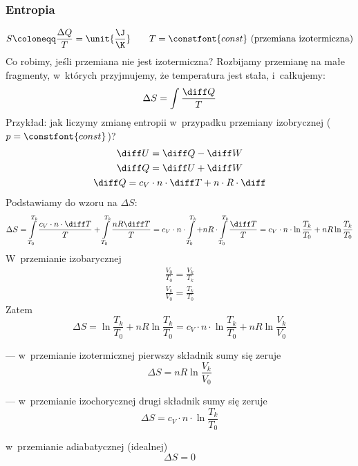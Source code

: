 \subsubsection*{Entropia}
\begin{equation*}
    S \coloneqq \frac{\Delta Q}{T} = \unit{\frac{\J}{\K}} \qquad T = \constfont{const} \text{ (przemiana izotermiczna)}\\
\end{equation*}
Co robimy, jeśli przemiana nie jest izotermiczna? Rozbijamy przemianę na małe fragmenty, w~których przyjmujemy, że temperatura jest stała, i~całkujemy:
\begin{equation*}
    \Delta S = \int\frac{\diff Q}{T}
\end{equation*}
Przykład: jak liczymy zmianę entropii w~przypadku przemiany izobrycznej (\(p = \constfont{const}\))?
\begin{gather*}
    \diff U = \diff Q - \diff W\\
    \diff Q = \diff U + \diff W\\
    \diff Q = c_V \cdot n \cdot \diff T + n \cdot R \cdot \diff
\end{gather*}
Podstawiamy do wzoru na \(\Delta S\):
\begin{equation*}
    \Delta S = \int\limits_{T_0}^{T_k} \frac{c_V \cdot n \cdot \diff T}{T} + \int\limits_{T_0}^{T_k} \frac{nR\diff T}{T}
    = c_V \cdot n \cdot \int\limits_{T_0}^{T_k} + nR \cdot \int\limits_{T_0}^{T_k} \frac{\diff T}{T} = c_V \cdot n \cdot \ln\frac{T_k}{T_0} + nR\ln\frac{T_k}{T_0}
\end{equation*}
W~przemianie izobarycznej
\begin{gather*}
    \frac{V_0}{T_0} = \frac{V_k}{T_k}\\
    \frac{V_k}{V_0} = \frac{T_k}{T_0}
\end{gather*}
Zatem
\begin{equation*}
    \Delta S = \ln\frac{T_k}{T_0} + nR\ln\frac{T_k}{T_0}
    = c_V \cdot n \cdot \ln\frac{T_k}{T_0} + nR\ln\frac{V_k}{V_0}
\end{equation*}
\begin{description}
    \item[\(T = \constfont{const}\)] --- w~przemianie izotermicznej pierwszy składnik sumy się zeruje
        \begin{equation*}
            \Delta S = nR\ln\frac{V_k}{V_0}
        \end{equation*}
    \item[\(V = \constfont{const}\)] --- w~przemianie izochorycznej drugi składnik sumy się zeruje
        \begin{equation*}
            \Delta S = c_V \cdot n \cdot \ln\frac{T_k}{T_0}
        \end{equation*}
    \item w~przemianie adiabatycznej (idealnej)
        \begin{equation*}
            \Delta S = 0
        \end{equation*}
\end{description}
